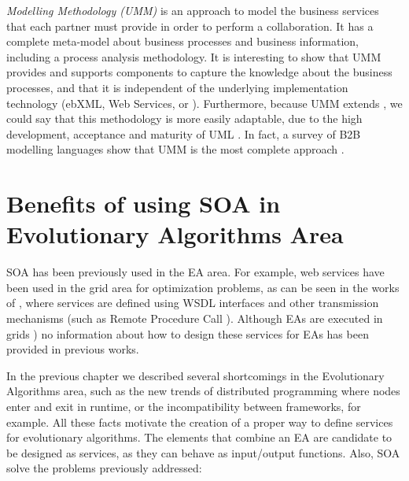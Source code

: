 {\em {} Modelling Methodology (UMM)}
\cite{Hofreiter06UMM} is an approach to model the business services
that each partner must provide in order to perform a
 collaboration. It has a
complete meta-model about business processes and business information,
including a process analysis methodology. It is interesting to show
that UMM provides and supports components to capture the knowledge
about the business processes, and that it is independent of the
underlying implementation technology (ebXML, Web Services,
 or
). Furthermore, because
UMM extends , we could
say that this methodology is more easily adaptable, due to the high
development, acceptance and maturity of UML \cite{Garcia09UMM}. In
fact, a survey of B2B modelling languages show that UMM is the most
complete approach \cite{Folmer08b2b}. 






\section{Benefits of using SOA in Evolutionary Algorithms Area}

\lettrine{S}{OA} has been previously used in the EA area. For example,
web services have been used in the grid area for optimization
problems, as can be seen in the works of
\cite{grid1,grid2,grid3,grid5}, where services are defined using WSDL
interfaces and other transmission mechanisms (such as Remote Procedure
Call \cite{grid6,grid7}). Although EAs are executed in grids
\cite{grid8,grid4,grid10}) no information about how to design these
services for EAs has been provided in previous works.  %

In the previous chapter we described several shortcomings %
 in the Evolutionary Algorithms area, such as the new trends of
 distributed programming where nodes enter and exit in runtime, or the
 incompatibility between frameworks, for example. All these facts
 motivate the creation of a proper way to define services for evolutionary algorithms. The elements that combine an EA are candidate to be designed as services, as they can behave as input/output functions. Also, SOA solve the problems previously addressed: 


